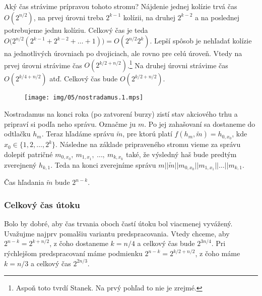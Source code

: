 Aký čas strávime prípravou tohoto stromu?
Nájdenie jednej kolízie trvá čas $O(2^{n/2})$, na prvej úrovni treba 
$2^{k-1}$ kolízii, na druhej $2^{k-2}$ a na poslednej
potrebujeme jednu kolíziu. Celkový čas je teda
$O\big(2^{n/2} (2^{k-1} + 2^{k-2} + \dots + 1)\big) = O(2^{n/2} 2^k)$.
Lepší spôsob je nehľadať kolízie na jednotlivých úrovniach po dvojiciach,
ale rovno pre celú úroveň.
Vtedy na prvej úrovni strávime čas $O(2^{k/2 + n/2})$.\footnote{
    Aspoň toto tvrdí Stanek. Na prvý pohľad to nie je zrejmé.}
Na druhej úrovni strávime čas $O(2^{k/4 + n/2})$ atď.
Celkový čas bude $O(2^{k/2 + n/2})$.

\begin{figure}[h]
    \centering
    \texttt{[image: img/05/nostradamus.1.mps]}
\end{figure}

Nostradamus na konci roka (po zatvorení burzy) zistí stav akciového
trhu a pripraví si podľa neho správu.
Označme ju $m$. Po jej zahašovaní sa dostaneme do odtlačku
$h_m$. Teraz hľadáme správu $\tilde{m}$, pre ktorú platí
$f(h_m, \tilde{m}) = h_{0,x_0}$, kde $x_0 \in \{1, 2, \dots, 2^k\}$.
Následne na základe pripraveného stromu vieme za správu dolepiť patričné 
$m_{0,x_0},\ m_{1,x_1},\ \dots,\ m_{k,x_k}$ také, že
výsledný haš bude predtým zverejnený $h_{k,1}$.
Teda na konci zverejníme správu 
$m || \tilde{m} || m_{0,x_0} || m_{1,x_1} || \dots || m_{k, 1}$.

Čas hľadania $\tilde{m}$ bude $2^{n-k}$.

\subsubsection{Celkový čas útoku}
Bolo by dobré, aby čas trvania oboch častí útoku bol viacmenej vyvážený. 
Uvažujme najprv pomalšiu variantu predspracovania.
Vtedy chceme, aby $2^{n-k} = 2^{k+n/2}$, z čoho dostaneme
$k=n/4$ a celkový čas bude $2^{3n/4}$.
Pri rýchlejšom predspracovaní máme podmienku $2^{n-k} = 2^{k/2 + n/2}$,
z čoho máme $k = n/3$ a celkový čas $2^{2n/3}$.

